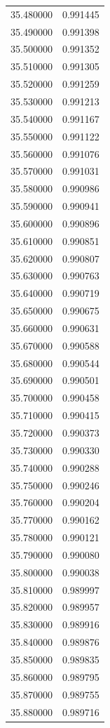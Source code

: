 \begin{tabular}{rr}
35.480000 & 0.991445 \\
35.490000 & 0.991398 \\
35.500000 & 0.991352 \\
35.510000 & 0.991305 \\
35.520000 & 0.991259 \\
35.530000 & 0.991213 \\
35.540000 & 0.991167 \\
35.550000 & 0.991122 \\
35.560000 & 0.991076 \\
35.570000 & 0.991031 \\
35.580000 & 0.990986 \\
35.590000 & 0.990941 \\
35.600000 & 0.990896 \\
35.610000 & 0.990851 \\
35.620000 & 0.990807 \\
35.630000 & 0.990763 \\
35.640000 & 0.990719 \\
35.650000 & 0.990675 \\
35.660000 & 0.990631 \\
35.670000 & 0.990588 \\
35.680000 & 0.990544 \\
35.690000 & 0.990501 \\
35.700000 & 0.990458 \\
35.710000 & 0.990415 \\
35.720000 & 0.990373 \\
35.730000 & 0.990330 \\
35.740000 & 0.990288 \\
35.750000 & 0.990246 \\
35.760000 & 0.990204 \\
35.770000 & 0.990162 \\
35.780000 & 0.990121 \\
35.790000 & 0.990080 \\
35.800000 & 0.990038 \\
35.810000 & 0.989997 \\
35.820000 & 0.989957 \\
35.830000 & 0.989916 \\
35.840000 & 0.989876 \\
35.850000 & 0.989835 \\
35.860000 & 0.989795 \\
35.870000 & 0.989755 \\
35.880000 & 0.989716 \\

\end{tabular}
